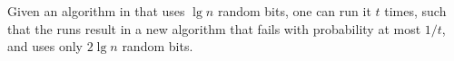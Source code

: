 \begin{lemma}
        Given an algorithm \Alg in  that uses $\lg n$
        random bits, one can run it $t$ times, such that the runs
        result in a new algorithm that fails with probability at most
        $1/t$, and uses only $2\lg n$ random bits.
    \end{lemma}
